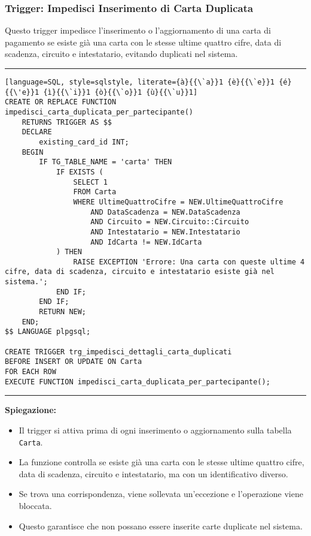 \subsubsection{Trigger: Impedisci Inserimento di Carta Duplicata}

Questo trigger impedisce l'inserimento o l'aggiornamento di una carta di pagamento se esiste già una carta con le stesse ultime quattro cifre, data di scadenza, circuito e intestatario, evitando duplicati nel sistema.

\noindent\rule{\textwidth}{0.4pt}
\begin{lstlisting}[language=SQL, style=sqlstyle, literate={à}{{\`a}}1 {è}{{\`e}}1 {é}{{\'e}}1 {ì}{{\`i}}1 {ò}{{\`o}}1 {ù}{{\`u}}1]
CREATE OR REPLACE FUNCTION impedisci_carta_duplicata_per_partecipante()
    RETURNS TRIGGER AS $$
    DECLARE
        existing_card_id INT;
    BEGIN
        IF TG_TABLE_NAME = 'carta' THEN
            IF EXISTS (
                SELECT 1
                FROM Carta
                WHERE UltimeQuattroCifre = NEW.UltimeQuattroCifre
                    AND DataScadenza = NEW.DataScadenza
                    AND Circuito = NEW.Circuito::Circuito
                    AND Intestatario = NEW.Intestatario
                    AND IdCarta != NEW.IdCarta
            ) THEN
                RAISE EXCEPTION 'Errore: Una carta con queste ultime 4 cifre, data di scadenza, circuito e intestatario esiste già nel sistema.';
            END IF;
        END IF;
        RETURN NEW;
    END;
$$ LANGUAGE plpgsql;

CREATE TRIGGER trg_impedisci_dettagli_carta_duplicati
BEFORE INSERT OR UPDATE ON Carta
FOR EACH ROW
EXECUTE FUNCTION impedisci_carta_duplicata_per_partecipante();
\end{lstlisting}
\noindent\rule{\textwidth}{0.4pt}

\textbf{Spiegazione:}
\begin{itemize}
    \item Il trigger si attiva prima di ogni inserimento o aggiornamento sulla tabella \texttt{Carta}.
    \item La funzione controlla se esiste già una carta con le stesse ultime quattro cifre, data di scadenza, circuito e intestatario, ma con un identificativo diverso.
    \item Se trova una corrispondenza, viene sollevata un'eccezione e l'operazione viene bloccata.
    \item Questo garantisce che non possano essere inserite carte duplicate nel sistema.
\end{itemize}

